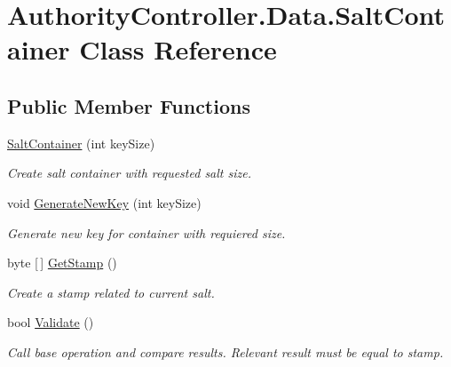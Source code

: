 \hypertarget{class_authority_controller_1_1_data_1_1_salt_container}{}\section{Authority\+Controller.\+Data.\+Salt\+Container Class Reference}
\label{class_authority_controller_1_1_data_1_1_salt_container}
\subsection*{Public Member Functions}
\begin{DoxyCompactItemize}
\item 
\mbox{\hyperlink{class_authority_controller_1_1_data_1_1_salt_container_ab4ddbf8061e1cb70a6f3c10c917ff4a7}{Salt\+Container}} (int key\+Size)
\begin{DoxyCompactList}\small\item\em Create salt container with requested salt size. \end{DoxyCompactList}\item 
void \mbox{\hyperlink{class_authority_controller_1_1_data_1_1_salt_container_ab259742d170bcae0854203dfde5d82b4}{Generate\+New\+Key}} (int key\+Size)
\begin{DoxyCompactList}\small\item\em Generate new key for container with requiered size. \end{DoxyCompactList}\item 
byte \mbox{[}$\,$\mbox{]} \mbox{\hyperlink{class_authority_controller_1_1_data_1_1_salt_container_a8b63952d86071a1e418112dfd5c8fdb3}{Get\+Stamp}} ()
\begin{DoxyCompactList}\small\item\em Create a stamp related to current salt. \end{DoxyCompactList}\item 
bool \mbox{\hyperlink{class_authority_controller_1_1_data_1_1_salt_container_accd0f30ba3b0eddaa84046b6971079d9}{Validate}} ()
\begin{DoxyCompactList}\small\item\em Call base operation and compare results. Relevant result must be equal to stamp. \end{DoxyCompactList}\end{DoxyCompactItemize}
